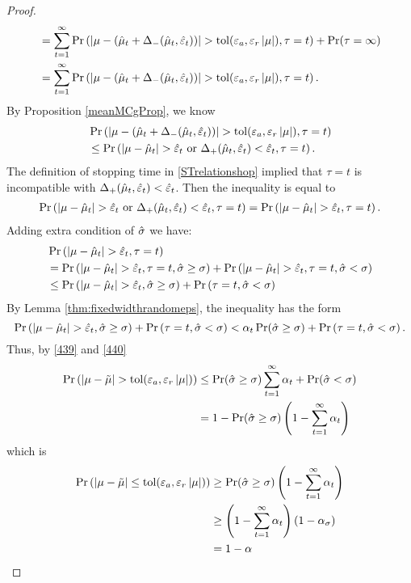 \documentclass{iitthesis}
\theoremstyle{definition}
\begin{document}
\begin{proof}
\begin{align}
&=\sum_{t=1}^\infty\Pr \left( \left \lvert \mu-(\hat{\mu}_t+\Delta_{-}(\hat{\mu}_t,\hat{\varepsilon}_t)) \right \rvert> \operatorname{tol}(\varepsilon_a,\varepsilon_r\left \lvert \mu \right \rvert), \tau = t \right)+\Pr(\tau = \infty)\nonumber\\
&=\sum_{t=1}^\infty\Pr \left( \left \lvert \mu-(\hat{\mu}_t+\Delta_{-}(\hat{\mu}_t,\hat{\varepsilon}_t)) \right \rvert> \operatorname{tol}(\varepsilon_a,\varepsilon_r\left \lvert \mu \right \rvert), \tau = t \right).
\end{align}
By Proposition \ref{meanMCgProp}, we know
\begin{align*}
 &\Pr \left( \left \lvert \mu-(\hat{\mu}_t+\Delta_{-}(\hat{\mu}_t,\hat{\varepsilon}_t)) \right \rvert> \operatorname{tol}(\varepsilon_a,\varepsilon_r\left \lvert \mu \right \rvert), \tau = t  \right)\\
&\leq
\Pr \left( \left \lvert \mu-\hat{\mu}_t \right \rvert>\hat{\varepsilon}_t  \text{ or } \Delta_{+}(\hat{\mu}_t,\hat{\varepsilon}_t)<\hat{\varepsilon}_t , \tau = t \right).
\end{align*}
The definition of stopping time in \eqref{STrelationshop} implied that $\tau = t$ is incompatible with $ \Delta_{+}(\hat{\mu}_t,\hat{\varepsilon}_t)<\hat{\varepsilon}_t$. Then the inequality is equal to
\begin{align*}
\Pr \left( \left \lvert \mu-\hat{\mu}_t \right \rvert> \hat{\varepsilon}_t  \text{ or } \Delta_{+}(\hat{\mu}_t,\hat{\varepsilon}_t)<\hat{\varepsilon}_t , \tau = t\right)= \Pr \left( \left \lvert \mu-\hat{\mu}_t \right \rvert> \hat{\varepsilon}_t, \tau = t \right).
\end{align*}
Adding extra condition of $\hat{\sigma}$ we have:
\begin{align*}
& \Pr \left( \left \lvert \mu-\hat{\mu}_t \right \rvert> \hat{\varepsilon}_t, \tau = t \right) \\
 &=  \Pr \left( \left \lvert \mu-\hat{\mu}_t \right \rvert> \hat{\varepsilon}_t, \tau = t , \hat{\sigma}\geq\sigma\right) + \Pr \left( \left \lvert \mu-\hat{\mu}_t \right \rvert> \hat{\varepsilon}_t, \tau = t,\hat{\sigma}<\sigma \right) \\
 & \leq \Pr \left( \left \lvert \mu-\hat{\mu}_t \right \rvert> \hat{\varepsilon}_t, \hat{\sigma}\geq\sigma\right) + \Pr \left(  \tau = t,\hat{\sigma}<\sigma \right)
\end{align*}
By Lemma \ref{thm:fixedwidthrandomeps}, the inequality has the form
\begin{equation}\label{440}
\Pr \left( \left \lvert \mu-\hat{\mu}_t \right \rvert> \hat{\varepsilon}_t, \hat{\sigma}\geq\sigma\right) + \Pr \left(  \tau = t,\hat{\sigma}<\sigma \right)\nonumber
<\alpha_t \Pr(\hat{\sigma} \geq \sigma) +\Pr \left(  \tau = t,\hat{\sigma}<\sigma \right).
\end{equation}
Thus, by \eqref{439} and \eqref{440}
\begin{align*}
\Pr \left( \left \lvert \mu-\tilde{\mu} \right \rvert > \operatorname{tol}(\varepsilon_a,\varepsilon_r\left \lvert \mu \right \rvert)\right) 
&\leq \Pr(\hat{\sigma} \geq \sigma) \sum_{t=1}^\infty \alpha_t+\Pr(\hat{\sigma}<\sigma)\\
&=1-\Pr(\hat{\sigma} \geq \sigma)\left(1-\sum_{t=1}^\infty \alpha_t\right)
\end{align*}
which is 
\begin{align*}
\Pr \left( \left \lvert \mu-\tilde{\mu} \right \rvert \leq \operatorname{tol}(\varepsilon_a,\varepsilon_r\left \lvert \mu \right \rvert)\right) &\geq \Pr(\hat{\sigma} \geq \sigma)\left(1-\sum_{t=1}^\infty \alpha_t\right) \\&\geq \left(1-\sum_{t=1}^\infty \alpha_t\right) (1-\alpha_\sigma) \\&= 1-\alpha
\end{align*}


\end{proof}
\end{document}
